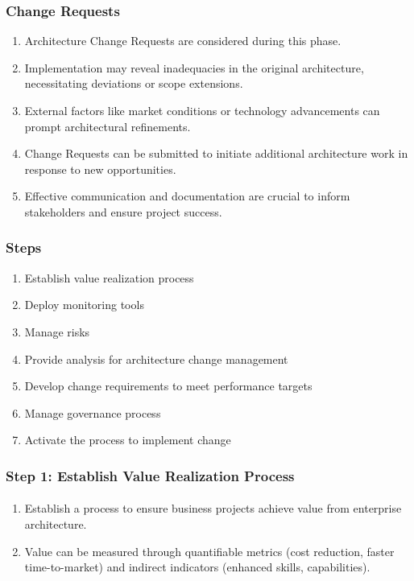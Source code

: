 \documentclass[aspectratio=169, table]{beamer}
\begin{document}
	\begin{frame}
		\frametitle{Change Requests}
		\vspace{20pt}
		\begin{enumerate}
			\item Architecture Change Requests are considered during this phase.
			
			\item Implementation may reveal inadequacies in the original architecture, necessitating deviations or scope extensions.
			
			\item External factors like market conditions or technology advancements can prompt architectural refinements.
			
			\item Change Requests can be submitted to initiate additional architecture work in response to new opportunities.
			
			\item Effective communication and documentation are crucial to inform stakeholders and ensure project success.
		\end{enumerate}
		
		
	\end{frame}
	
	\begin{frame}
		\frametitle{Steps}
		\vspace{20pt}
		\begin{enumerate}
			\item Establish value realization process
			\item Deploy monitoring tools
			\item Manage risks
			\item Provide analysis for architecture change management
			\item Develop change requirements to meet performance targets
			\item Manage governance process
			\item Activate the process to implement change
		\end{enumerate}
	\end{frame}
	
	\begin{frame}
		\frametitle{Step 1: Establish Value Realization Process}
		\framesubtitle{\hspace{1cm}}
		\vspace{20pt}
		\begin{enumerate}
			\item Establish a process to ensure business projects achieve value from enterprise architecture.
			
			\item Value can be measured through quantifiable metrics (cost reduction, faster time-to-market) and indirect indicators (enhanced skills, capabilities).
		\end{enumerate}
		
	\end{frame}
	
\end{document}
